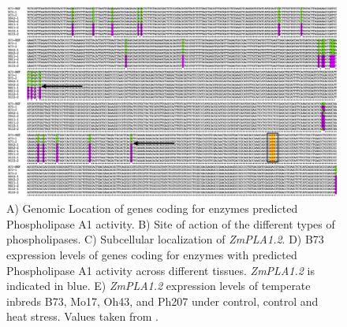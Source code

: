 \documentclass[9pt,twocolumn,twoside,lineno]{BioRxiv}
\begin{document}
\begin{figure}[t]
\begin{center}
\includegraphics[width=0.8\paperwidth]{Sup_Figures/Sup_Fig_4.png}

\caption{A) Genomic Location of genes coding for enzymes predicted Phospholipase A1 activity. 
B) Site of action of the different types of phospholipases.
C) Subcellular localization of \textit{ZmPLA1.2}.
D) B73 expression levels of genes coding for enzymes with predicted Phospholipase A1 activity across different tissues. \textit{ZmPLA1.2} is indicated in blue. 
E) \textit{ZmPLA1.2} expression levels of temperate inbreds B73, Mo17, Oh43, and Ph207 under control, control and heat stress. Values taken from \cite{Waters2017-nat}. 
}
\label{SupFig3}
\end{center}
\end{figure} 
\end{document}
